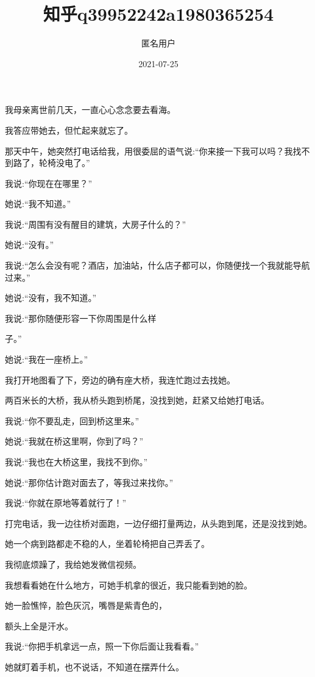 \documentclass{article}
\title{知乎q39952242a1980365254}
\author{匿名用户}
\date{2021-07-25}
\begin{document}

\maketitle


\Large

﻿我母亲离世前几天，一直心心念念要去看海。

我答应带她去，但忙起来就忘了。

那天中午，她突然打电话给我，用很委屈的语气说:“你来接一下我可以吗？我找不到路了，轮椅没电了。”

我说:“你现在在哪里？”

她说:“我不知道。”

我说:“周围有没有醒目的建筑，大房子什么的？”

她说:“没有。”

我说:“怎么会没有呢？酒店，加油站，什么店子都可以，你随便找一个我就能导航过来。”

她说:“没有，我不知道。”

我说:“那你随便形容一下你周围是什么样

\newpage 

子。”

她说:“我在一座桥上。”

我打开地图看了下，旁边的确有座大桥，我连忙跑过去找她。

两百米长的大桥，我从桥头跑到桥尾，没找到她，赶紧又给她打电话。

我说:“你不要乱走，回到桥这里来。”

她说:“我就在桥这里啊，你到了吗？”

我说:“我也在大桥这里，我找不到你。”

她说:“那你估计跑对面去了，等我过来找你。”

我说:“你就在原地等着就行了！”

打完电话，我一边往桥对面跑，一边仔细打量两边，从头跑到尾，还是没找到她。

她一个病到路都走不稳的人，坐着轮椅把自己弄丢了。

我彻底烦躁了，我给她发微信视频。

我想看看她在什么地方，可她手机拿的很近，我只能看到她的脸。

她一脸憔悴，脸色灰沉，嘴唇是紫青色的，

\newpage 

额头上全是汗水。

我说:“你把手机拿远一点，照一下你后面让我看看。”

她就盯着手机，也不说话，不知道在摆弄什么。
\end{document}
